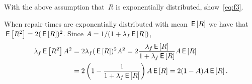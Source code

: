 \documentclass[queueing-book.tex]{subfiles}
\begin{document}
\begin{exercise}\label{ex:l-161}
With the above assumption that~$R$ is exponentially distributed, show~\cref{eq:f3}.
\begin{solution}
When repair times are exponentially distributed with mean $\,\mathsf{E}\left[R\right]$ we have that  $\,\mathsf{E}\left[R^2\right]=2(\,\mathsf{E}\left[R\right])^2$. Since $A=1/(1+\lambda_f \,\mathsf{E}\left[R\right])$,
 \begin{equation*}
 \begin{split}
 \lambda_f \,\mathsf{E}\left[R^2\right] A^2
&= 2\lambda_f (\,\mathsf{E}\left[R\right])^2 A^2
= 2 \frac{\lambda_f \,\mathsf{E}\left[R\right] }{1+\lambda_f \,\mathsf{E}\left[R\right]} A \,\mathsf{E}\left[R\right] \\
&= 2 \left(1-\frac{1}{1+\lambda_f \,\mathsf{E}\left[R\right]}\right) A \,\mathsf{E}\left[R\right] = 2(1-A)A \,\mathsf{E}\left[R\right].
 \end{split}
 \end{equation*}
\end{solution}
\end{exercise}







\end{document}

